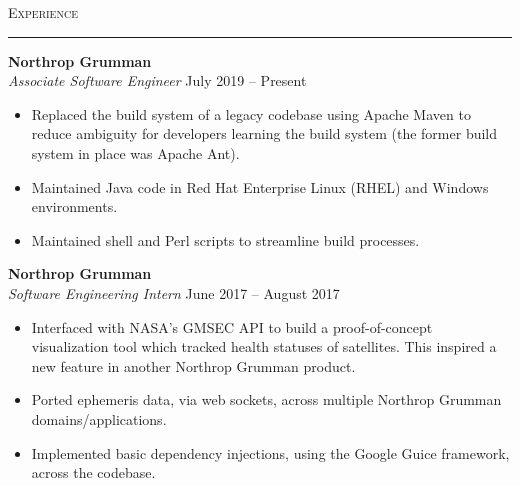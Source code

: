 \documentclass{res}
\begin{document}
\begin{resume}
\textsc{{\Large Experience}}
\vspace{0.5mm}
\hrule width18.5cm
\textbf{Northrop Grumman}\\
\textit{Associate Software Engineer}
\hfill
July 2019 -- Present\\[1mm]
	\begin{itemize}
		\vspace{-3mm}
    \item Replaced the build system of a legacy codebase using Apache Maven to reduce ambiguity for developers learning the build system (the former build system in place was Apache Ant).
    \item Maintained Java code in Red Hat Enterprise Linux (RHEL) and Windows environments.
    \item Maintained shell and Perl scripts to streamline build processes.
  \end{itemize}
\textbf{Northrop Grumman}\\
\textit{Software Engineering Intern}
\hfill
June 2017 -- August 2017\\[1mm]
	\begin{itemize}
		\vspace{-3mm}
		\item Interfaced with NASA's GMSEC API to build a proof-of-concept visualization tool which tracked health statuses of satellites. This inspired a new feature in another Northrop Grumman product.
		\item Ported ephemeris data, via web sockets, across multiple Northrop Grumman domains/applications.
		\item Implemented basic dependency injections, using the Google Guice framework, across the codebase.
	\end{itemize}


\end{resume}
\end{document}
